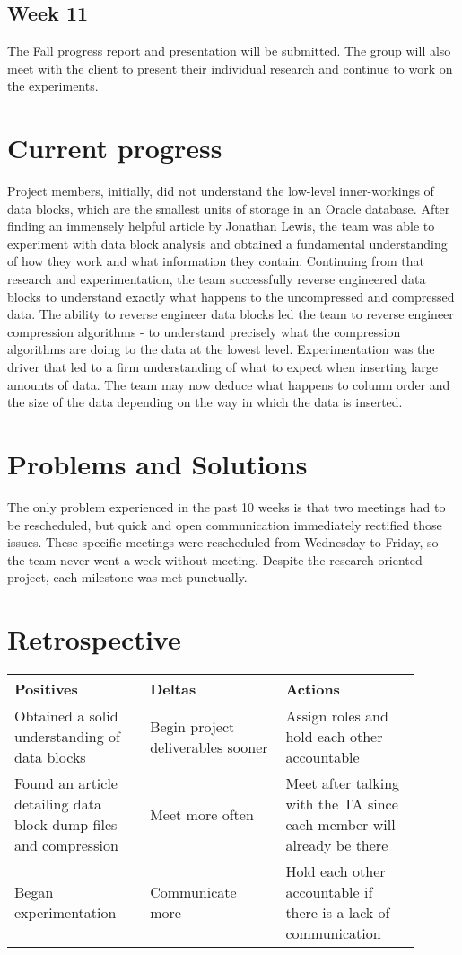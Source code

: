 \documentclass[10pt]{article}
\begin{document}
\subsection{Week 11}
The Fall progress report and presentation will be submitted. The group will also meet with the client to present their individual research and continue to work on the experiments.

\section{Current progress}
Project members, initially, did not understand the low-level inner-workings of data blocks, which are the smallest units of storage in an Oracle database. After finding an immensely helpful article by Jonathan Lewis, the team was able to experiment with data block analysis and obtained a fundamental understanding of how they work and what information they contain. Continuing from that research and experimentation, the team successfully reverse engineered data blocks to understand exactly what happens to the uncompressed and compressed data. The ability to reverse engineer data blocks led the team to reverse engineer compression algorithms - to understand precisely what the compression algorithms are doing to the data at the lowest level. Experimentation was the driver that led to a firm understanding of what to expect when inserting large amounts of data. The team may now deduce what happens to column order and the size of the data depending on the way in which the data is inserted.

\section{Problems and Solutions}
The only problem experienced in the past 10 weeks is that two meetings had to be rescheduled, but quick and open communication immediately rectified those issues. These specific meetings were rescheduled from Wednesday to Friday, so the team never went a week without meeting. Despite the research-oriented project, each milestone was met punctually.

\section{Retrospective}

\begin{tabular}{| p{0.3\linewidth} | p{0.3\linewidth} | p{0.3\linewidth} |}
\hline
\textbf{Positives} & \textbf{Deltas}  & \textbf{Actions} \\ \hline
Obtained a solid understanding of data blocks &  Begin project deliverables sooner & Assign roles and hold each other accountable \\ \hline
Found an article detailing data block dump files and compression & Meet more often & Meet after talking with the TA since each member will already be there \\ \hline
Began experimentation & Communicate more & Hold each other accountable if there is a lack of communication \\ \hline
\end{tabular}
\end{document}
